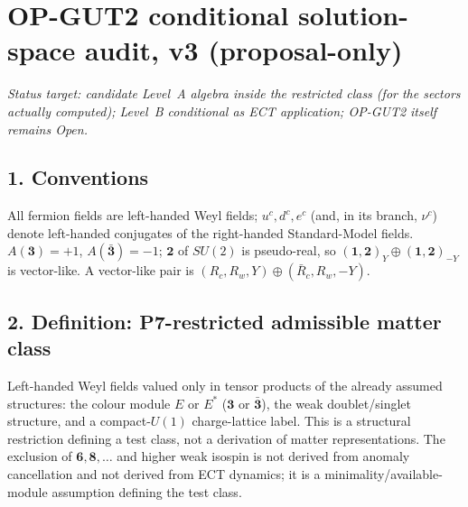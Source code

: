 \section*{OP-GUT2 conditional solution-space audit, v3
(proposal-only)}

\textit{Status target: candidate Level~A algebra inside the
restricted class (for the sectors actually computed); Level~B
conditional as ECT application; OP-GUT2 itself remains Open.}

\subsection*{1. Conventions}
All fermion fields are left-handed Weyl fields; $u^c,d^c,e^c$
(and, in its branch, $\nu^c$) denote left-handed conjugates of the
right-handed Standard-Model fields.
$A(\mathbf 3)=+1$, $A(\bar{\mathbf 3})=-1$;
$\mathbf 2$ of $SU(2)$ is pseudo-real, so
$(\mathbf 1,\mathbf 2)_Y\oplus(\mathbf 1,\mathbf 2)_{-Y}$ is
vector-like.
A vector-like pair is $(R_c,R_w,Y)\oplus(\bar R_c,R_w,-Y)$.

\subsection*{2. Definition: P7-restricted admissible matter class}
Left-handed Weyl fields valued only in tensor products of the
already assumed structures: the colour module $E$ or $E^*$
($\mathbf 3$ or $\bar{\mathbf 3}$), the weak doublet/singlet
structure, and a compact-$U(1)$ charge-lattice label.
This is a structural restriction defining a test class, not a
derivation of matter representations.
The exclusion of $\mathbf 6,\mathbf 8,\dots$ and higher weak
isospin is not derived from anomaly cancellation and not derived
from ECT dynamics; it is a minimality/available-module assumption
defining the test class.

